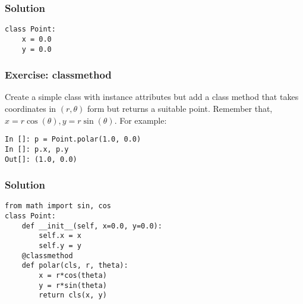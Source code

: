\documentclass[14pt,compress,aspectratio=169]{beamer}
\begin{document}
\begin{frame}
  \frametitle{Solution}
\begin{lstlisting}
class Point:
    x = 0.0
    y = 0.0
\end{lstlisting}
\end{frame}

\begin{frame}
  \frametitle{Exercise: classmethod}
  \begin{block}{}
    Create a simple  class with instance attributes  but
    add a class method  that takes coordinates in $(r,
    \theta)$ form but returns a suitable point. Remember that, $x=r
    \cos(\theta), y=r\sin(\theta)$. For example:
  \end{block}

\begin{lstlisting}
In []: p = Point.polar(1.0, 0.0)
In []: p.x, p.y
Out[]: (1.0, 0.0)
\end{lstlisting}

\end{frame}


\begin{frame}
  \frametitle{Solution}
\begin{lstlisting}
from math import sin, cos
class Point:
    def __init__(self, x=0.0, y=0.0):
        self.x = x
        self.y = y
    @classmethod
    def polar(cls, r, theta):
        x = r*cos(theta)
        y = r*sin(theta)
        return cls(x, y)

\end{lstlisting}
\end{frame}
\end{document}

